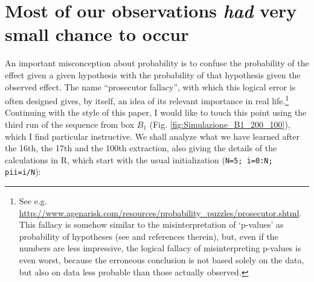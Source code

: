 \documentclass[11pt]{article}
\begin{document}
\section{Most of our observations {\em had} 
very small chance to occur}
An important misconception about probability is to
confuse the probability of the effect given a given 
hypothesis with the probability of that hypothesis
given the observed effect. The name ``prosecutor fallacy'',
with which this logical error is often designed 
gives, by itself, an idea of its relevant importance 
in real life.\footnote{See  e.g.
\url{http://www.agenarisk.com/resources/probability_puzzles/prosecutor.shtml}.
This fallacy is somehow similar to the misinterpretation
of `p-values' as probability of hypotheses 
(see \cite{BadMath,WavesSigmas} and references therein), 
but, even if the numbers are less impressive, 
the logical fallacy of misinterpreting p-values
 is even worst, because the erroneous 
conclusion is not based solely on the data, 
but also on data less probable than those actually observed.
}
Continuing with the style of this paper, I would like 
to touch this point using the third run of the sequence
from box $B_1$ (Fig. \ref{fig:Simulazione_B1_200_100}),
which I find particular instructive. We shall analyze what we have learned 
after  the 16th, the 17th and the 100th extraction, 
also giving the details of the calculations in R,
which start with the usual initialization 
  (\verb|N=5; i=0:N; pii=i/N|):
\end{document}
